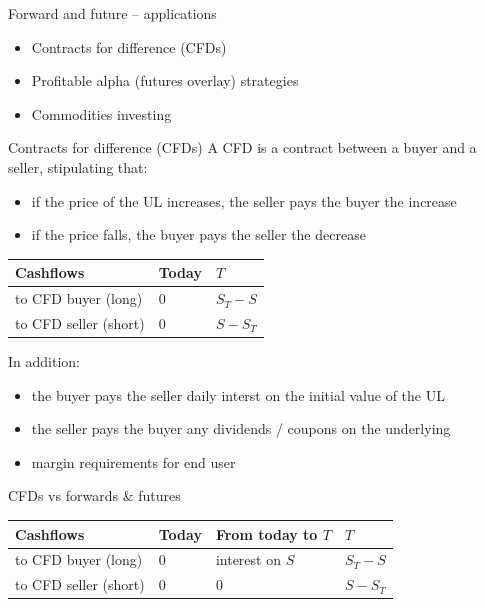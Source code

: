 \documentclass[
  ignorenonframetext,
  aspectratio=169]{beamer}
\providecommand{\tightlist}{%
  \setlength{\itemsep}{0pt}\setlength{\parskip}{0pt}}
\begin{document}
\begin{frame}{Forward and future -- applications}
\protect\hypertarget{forward-and-future-applications}{}
\begin{itemize}
\tightlist
\item
  Contracts for difference (CFDs)
\item
  Profitable alpha (futures overlay) strategies
\item
  Commodities investing
\end{itemize}
\end{frame}

\begin{frame}{Contracts for difference (CFDs)}
\protect\hypertarget{contracts-for-difference-cfds}{}
A CFD is a contract between a buyer and a seller, stipulating that:

\begin{itemize}
\tightlist
\item
  if the price of the UL increases, the seller pays the buyer the
  increase
\item
  if the price falls, the buyer pays the seller the decrease
\end{itemize}

\begin{longtable}[]{@{}lll@{}}
\toprule
Cashflows & Today & \(T\) \\
\midrule
\endhead
to CFD buyer (long) & 0 & \(S_T-S\) \\
to CFD seller (short) & 0 & \(S-S_T\) \\
\bottomrule
\end{longtable}

In addition:

\begin{itemize}
\tightlist
\item
  the buyer pays the seller daily interst on the initial value of the UL
\item
  the seller pays the buyer any dividends / coupons on the underlying
\item
  margin requirements for end user
\end{itemize}
\end{frame}

\begin{frame}{CFDs vs forwards \& futures}
\protect\hypertarget{cfds-vs-forwards-futures}{}
\begin{longtable}[]{@{}llll@{}}
\toprule
Cashflows & Today & From today to \(T\) & \(T\) \\
\midrule
\endhead
to CFD buyer (long) & 0 & interest on \(S\) & \(S_T-S\) \\
to CFD seller (short) & 0 & 0 & \(S-S_T\) \\
\bottomrule
\end{longtable}
\end{frame}
\end{document}
